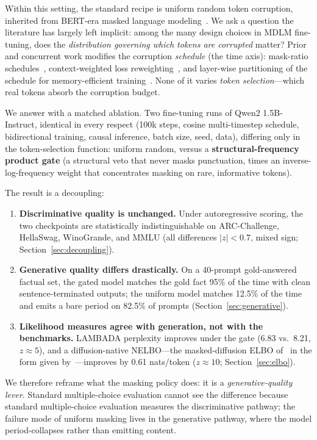 \documentclass{article}
\begin{document}
Within this setting, the standard recipe is uniform random token corruption, inherited
from BERT-era masked language modeling~\cite{devlin2019bert}. We ask a question the
literature has largely left implicit: among the many design choices in MDLM
fine-tuning, does the \emph{distribution governing which tokens are corrupted} matter?
Prior and concurrent work modifies the corruption \emph{schedule} (the time axis):
mask-ratio schedules~\cite{sahoo2024mdlm}, context-weighted loss
reweighting~\cite{contextweighted2026}, and layer-wise partitioning of the schedule for
memory-efficient training~\cite{shing2026diffusionblocks}. None of it varies
\emph{token selection}---which real tokens absorb the corruption budget.

We answer with a matched ablation. Two fine-tuning runs of Qwen2 1.5B-Instruct,
identical in every respect (100k steps, cosine multi-timestep schedule, bidirectional
training, causal inference, batch size, seed, data), differing only in the
token-selection function: uniform random, versus a \textbf{structural-frequency product
gate} (a structural veto that never masks punctuation, times an inverse-log-frequency
weight that concentrates masking on rare, informative tokens).

The result is a decoupling:
\begin{enumerate}
    \item \textbf{Discriminative quality is unchanged.} Under autoregressive scoring,
    the two checkpoints are statistically indistinguishable on ARC-Challenge,
    HellaSwag, WinoGrande, and MMLU (all differences $|z| < 0.7$, mixed sign;
    Section~\ref{sec:decoupling}).
    \item \textbf{Generative quality differs drastically.} On a 40-prompt
    gold-answered factual set, the gated model matches the gold fact 95\% of the time
    with clean sentence-terminated outputs; the uniform model matches 12.5\% of the
    time and emits a bare period on 82.5\% of prompts (Section~\ref{sec:generative}).
    \item \textbf{Likelihood measures agree with generation, not with the benchmarks.}
    LAMBADA perplexity improves under the gate (6.83 vs.\ 8.21, $z \approx 5$), and a
    diffusion-native NELBO---the masked-diffusion ELBO of~\cite{sahoo2024mdlm} in the
    form given by~\cite{arriola2025blockdiffusion}---improves by 0.61 nats/token
    ($z \approx 10$; Section~\ref{sec:elbo}).
\end{enumerate}

We therefore reframe what the masking policy does: it is a \emph{generative-quality
lever}. Standard multiple-choice evaluation cannot see the difference because standard
multiple-choice evaluation measures the discriminative pathway; the failure mode of
uniform masking lives in the generative pathway, where the model period-collapses
rather than emitting content.
\end{document}
